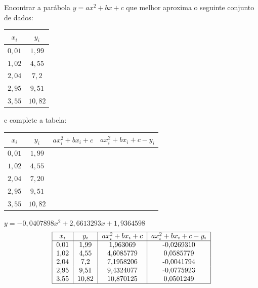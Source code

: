 \begin{Exercise}Encontrar  a parábola $y=ax^2+bx+c$ que melhor aproxima o seguinte conjunto de dados:
  \begin{center}
    \begin{tabular}{|c|c|}
      \hline
      $x_i$ & $y_i$\\
      \hline
      $0,01$ & $1,99$\\
      $1,02$ & $4,55$\\
      $2,04$ & $7,2$\\
      $2,95$ & $9,51$\\
      $3,55$ & $10,82$\\
      \hline
    \end{tabular}    
  \end{center}
  e complete a tabela:
  \begin{center}
    \begin{tabular}{|c|c|c|c|}
      \hline
      $x_i$ & $y_i$& $ax_i^2+bx_i+c$& $ax_i^2+bx_i+c-y_i$\\
      \hline
      $0,01$ & $1,99$& &\\
      $1,02$ & $4,55$&& \\
      $2,04$ & $7,20$&  & \\
      $2,95$ & $9,51$  &  & \\
      $3,55$ & $10,82$&&\\
      \hline
    \end{tabular}
  \end{center}
\end{Exercise}
\begin{Answer}
  \begin{tiny}
$y=-0,0407898x^2+ 2,6613293x+ 1,9364598$    
\begin{equation*}
\begin{tabular}{|c|c|c|c|}
\hline
$x_i$ & $y_i$& $ax_i^2+bx_i+c$& $ax_i^2+bx_i+c-y_i$\\
\hline
0,01 & 1,99&1,963069&-0,0269310  \\
1,02 & 4,55&4,6085779&    0,0585779  \\
2,04 & 7,2&7,1958206  &  -0,0041794  \\
2,95 & 9,51& 9,4324077   &-0,0775923   \\
3,55 & 10,82& 10,870125   &0,0501249\\
\hline
\end{tabular}  
\end{equation*}
  \end{tiny}
\end{Answer}


